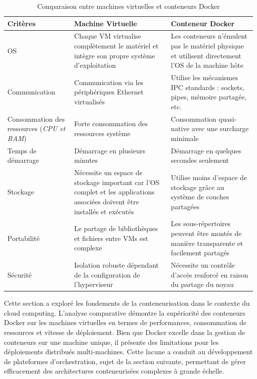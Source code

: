 \begin{table}[h]
\centering
\caption{Comparaison entre machines virtuelles et conteneurs Docker}
\label{tab:vm_vs_docker}
\begin{tabular}{|p{3cm}|p{5cm}|p{5cm}|}
\hline
\rowcolor{gray!30}
\textbf{Critères} & \textbf{Machine Virtuelle} & \textbf{Conteneur Docker} \\
\hline
OS & Chaque VM virtualise complètement le matériel et intègre son propre système d'exploitation & Les conteneurs n'émulent pas le matériel physique et utilisent directement l'OS de la machine hôte \\
\hline
Communication & Communication via les périphériques Ethernet virtualisés & Utilise les mécanismes IPC standards : sockets, pipes, mémoire partagée, etc. \\
\hline
Consommation des ressources (\textit{CPU et RAM}) & Forte consommation des ressources système & Consommation quasi-native avec une surcharge minimale \\
\hline
Temps de démarrage & Démarrage en plusieurs minutes & Démarrage en quelques secondes seulement \\
\hline
Stockage & Nécessite un espace de stockage important car l'OS complet et les applications associées doivent être installés et exécutés & Utilise moins d'espace de stockage grâce au système de couches partagées \\
\hline
Portabilité & Le partage de bibliothèques et fichiers entre VMs est complexe & Les sous-répertoires peuvent être montés de manière transparente et facilement partagés \\
\hline
Sécurité & Isolation robuste dépendant de la configuration de l'hyperviseur & Nécessite un contrôle d'accès renforcé en raison du partage du noyau \\
\hline
\end{tabular}
\end{table}

Cette section a exploré les fondements de la conteneurisation dans le contexte du cloud computing. L'analyse comparative démontre la supériorité des conteneurs Docker sur les machines virtuelles en termes de performances, consommation de ressources et vitesse de déploiement.
Bien que Docker excelle dans la gestion de conteneurs sur une machine unique, il présente des limitations pour les déploiements distribués multi-machines. Cette lacune a conduit au développement de plateformes d'orchestration, sujet de la section suivante, permettant de gérer efficacement des architectures conteneurisées complexes à grande échelle.

